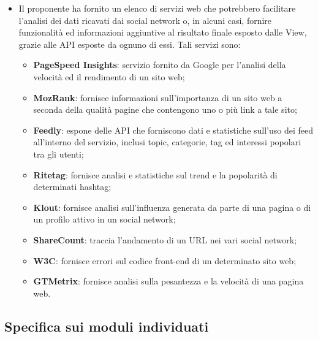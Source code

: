 \begin{itemize}
  \item Il proponente ha fornito un elenco di servizi web che potrebbero facilitare l'analisi dei dati
  ricavati dai social network o, in alcuni casi, fornire funzionalità ed informazioni aggiuntive al
  risultato finale esposto dalle View, grazie alle API esposte da ognuno di essi. Tali servizi sono:
  \begin{itemize}
    \item \textbf{PageSpeed Insights}: servizio fornito da Google per l'analisi della velocità ed il
    rendimento di un sito web;
    \item \textbf{MozRank}: fornisce informazioni sull'importanza di un sito web a seconda della qualità
    pagine che contengono uno o più link a tale sito;
    \item \textbf{Feedly}: espone delle API che forniscono dati e statistiche sull'uso dei feed all'interno
    del servizio, inclusi topic, categorie, tag ed interessi popolari tra gli utenti;
    \item \textbf{Ritetag}: fornisce analisi e statistiche sul trend e la popolarità di determinati hashtag;
    \item \textbf{Klout}: fornisce analisi sull'influenza generata da parte di una pagina o di un profilo
    attivo in un social network;
    \item \textbf{ShareCount}: traccia l'andamento di un URL nei vari social network;
    \item \textbf{W3C}: fornisce errori sul codice front-end di un determinato sito web;
    \item \textbf{GTMetrix}: fornisce analisi sulla pesantezza e la velocità di una pagina web.
  \end{itemize}
\end{itemize}

\subsection{Specifica sui moduli individuati}

